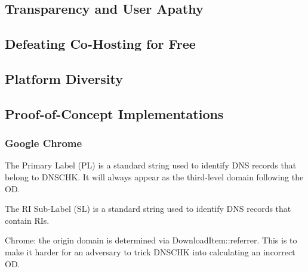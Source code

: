 
\subsection{Transparency and User Apathy}



\subsection{Defeating Co-Hosting for Free}



\subsection{Platform Diversity}



\subsection{Proof-of-Concept Implementations}

\subsubsection{Google Chrome}


The Primary Label (PL) is a standard string used to identify DNS records that
belong to DNSCHK. It will always appear as the third-level domain following the
OD.

The RI Sub-Label (SL) is a standard string used to identify DNS records that
contain RIs.

Chrome: the origin domain is determined via DownloadItem::referrer.
This is to make it harder for an adversary to trick DNSCHK into calculating an
incorrect OD.



